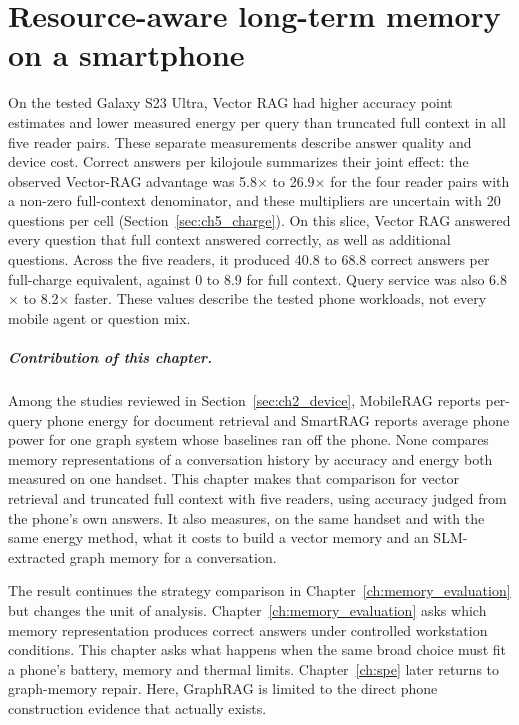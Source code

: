 
\chapter{Resource-aware long-term memory on a smartphone}
\label{ch:on_device_memory}

On the tested Galaxy S23 Ultra, Vector RAG had higher accuracy point estimates and lower measured
energy per query than truncated full context in all five reader pairs. These separate measurements
describe answer quality and device cost. Correct answers per kilojoule summarizes their joint
effect: the observed Vector-RAG advantage was 5.8$\times$ to 26.9$\times$ for the four reader pairs
with a non-zero full-context denominator, and these multipliers are uncertain with 20 questions
per cell (Section~\ref{sec:ch5_charge}). On this slice, Vector RAG answered every question that full
context answered correctly, as well as additional questions. Across the five readers, it produced
40.8 to 68.8 correct answers per full-charge equivalent, against 0 to 8.9 for full context. Query
service was also 6.8$\times$ to 8.2$\times$ faster. These values describe the tested phone
workloads, not every mobile agent or question mix.

\paragraph{Contribution of this chapter.} Among the studies reviewed in
Section~\ref{sec:ch2_device}, MobileRAG reports per-query phone energy for document retrieval and
SmartRAG reports average phone power for one graph system whose baselines ran off the phone. None
compares memory representations of a conversation history by accuracy and energy both measured on
one handset. This chapter makes that comparison for vector retrieval and truncated full context
with five readers, using accuracy judged from the phone's own answers. It also measures, on the same
handset and with the same energy method, what it costs to build a vector memory and an
SLM-extracted graph memory for a conversation.

The result continues the strategy comparison in Chapter~\ref{ch:memory_evaluation} but
changes the unit of analysis. Chapter~\ref{ch:memory_evaluation} asks which memory
representation produces correct answers under controlled workstation conditions. This
chapter asks what happens when the same broad choice must fit a phone's battery, memory
and thermal limits. Chapter~\ref{ch:spe} later returns to graph-memory repair. Here,
GraphRAG is limited to the direct phone construction evidence that actually exists.

